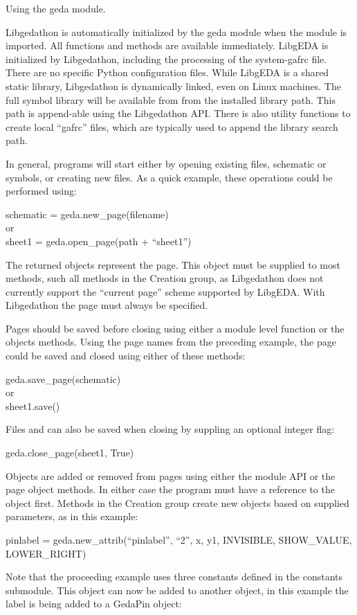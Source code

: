  Using the geda module. 

  Libgedathon is automatically initialized by the geda module when the module is imported. All functions and methods are available immediately. LibgEDA is initialized by Libgedathon, including the processing of the system-gafrc file. There are no specific Python configuration files. While LibgEDA is a shared static library, Libgedathon is dynamically linked, even on Linux machines. The full symbol library will be available from from the installed library path. This path is append-able using the Libgedathon API. There is also utility functions to create local ``gafrc'' files, which are typically used to append the library search path. 


  In general, programs will start either by opening existing files, schematic or symbols, or creating new files. As a quick example, these operations could be performed using:

schematic = geda.new\_page(filename)\\ 
 or\\ 
sheet1 = geda.open\_page(path + ``sheet1'')


  The returned objects represent the page. This object must be supplied to most methods, such all methods in the Creation group, as Libgedathon does not currently support the ``current page'' scheme supported by LibgEDA. With Libgedathon the page must always be specified. 


  Pages should be saved before closing using either a module level function or the objects methods. Using the page names from the preceding example, the page could be saved and closed using either of these methods:

geda.save\_page(schematic)\\ 
 or\\ 
sheet1.save()


  Files and can also be saved when closing by suppling an optional integer flag:

geda.close\_page(sheet1, True)

  Objects are added or removed from pages using either the module API or the page object methods. In either case the program must have a reference to the object first. Methods in the Creation group create new objects based on supplied parameters, as in this example:

pinlabel = geda.new\_attrib(``pinlabel'', ``2'', x, y1, INVISIBLE, SHOW\_VALUE, LOWER\_RIGHT)

  Note that the proceeding example uses three constants defined in the constants submodule. This object can now be added to another object, in this example the label is being added to a GedaPin object:


